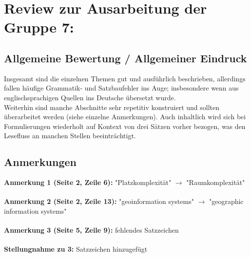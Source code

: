 \documentclass[a4paper,12pt]{book}
\begin{document}
\chapter*{Review zur Ausarbeitung der Gruppe 7:}

\section*{Allgemeine Bewertung / Allgemeiner Eindruck}
Insgesamt sind die einzelnen Themen gut und ausführlich beschrieben, allerdings fallen häufige Grammatik- und Satzbaufehler ins Auge; insbesondere wenn aus englischsprachigen Quellen ins Deutsche übersetzt wurde.\\
Weiterhin sind manche Abschnitte sehr repetitiv konstruiert und sollten überarbeitet werden (siehe einzelne Anmerkungen).
Auch inhaltlich wird sich bei Formulierungen wiederholt auf Kontext von drei Sätzen vorher bezogen, was den Lesefluss an manchen Stellen beeinträchtigt.

\section*{Anmerkungen}

\textbf{Anmerkung 1 (Seite 2, Zeile 6):}
"Platzkomplexität" $\rightarrow$ "Raumkomplexität"\\
\\

\noindent
\textbf{Anmerkung 2 (Seite 2, Zeile 13):}
"geoinformation systems" $\rightarrow$ "geographic information systems"\\
\\

\noindent
\textbf{Anmerkung 3 (Seite 5, Zeile 9):}
fehlendes Satzzeichen
\\ \\
\textbf{Stellungnahme zu 3:}
Satzzeichen hinzugefügt
\\
\end{document}
